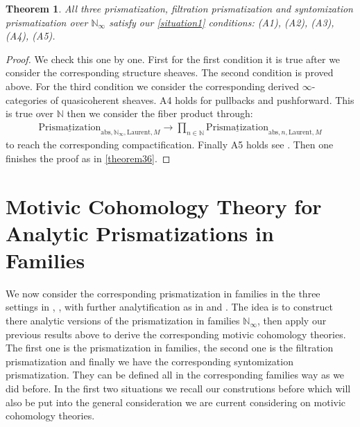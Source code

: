 \documentclass[12pt]{article}
\newtheorem{theorem}{Theorem}
\theoremstyle{definition}
\begin{document}
\begin{theorem}
All three prismatization, filtration prismatization and syntomization prismatization over $\mathbb{N}_\infty$ satisfy our \cref{situation1} conditions: (A1), (A2), (A3), (A4), (A5).
\end{theorem}


\begin{proof}
We check this one by one. First for the first condition it is true after we consider the corresponding structure sheaves. The second condition is proved above. For the third condition we consider the corresponding derived $\infty$-categories of quasicoherent sheaves. A4 holds for pullbacks and pushforward. This is true over $\mathbb{N}$ then we consider the fiber product through:
\begin{align}
{\underline{\mathrm{Prismatization}}}_{\mathrm{abs},\mathbb{N}_\infty,\mathrm{Laurent},M}\rightarrow  \prod_{n\in \mathbb{N}} {\underline{\mathrm{Prismatization}}}_{\mathrm{abs},n,\mathrm{Laurent},M}
\end{align}
to reach the corresponding compactification. Finally A5 holds see \cite[Chapter 4, in particular 4.7, 4.8, 4.9, 4.10]{3A}. Then one finishes the proof as in \cref{theorem36}.
\end{proof}







\newpage
\section{Motivic Cohomology Theory for Analytic Prismatizations in Families}\label{section10}


\indent We now consider the corresponding prismatization in families in the three settings in \cite{3BL}, \cite{3D}, with further analytification as in \cite{3ALBRCS} and \cite{3S1}. The idea is to construct there analytic versions of the prismatization in families $\mathbb{N}_\infty$, then apply our previous results above to derive the corresponding motivic cohomology theories. The first one is the prismatization in families, the second one is the filtration prismatization and finally we have the corresponding syntomization prismatization. They can be defined all in the corresponding families way as we did before. In the first two situations we recall our construtions before which will also be put into the general consideration we are current considering on motivic cohomology theories.
\end{document}
